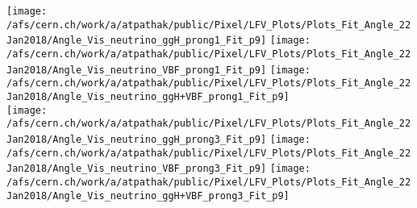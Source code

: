 \documentclass{beamer}
\begin{document}
\begin{frame}
\begin{normalsize}
\begin{center}
\texttt{[image: /afs/cern.ch/work/a/atpathak/public/Pixel/LFV\_Plots/Plots\_Fit\_Angle\_22Jan2018/Angle\_Vis\_neutrino\_ggH\_prong1\_Fit\_p9]}
\texttt{[image: /afs/cern.ch/work/a/atpathak/public/Pixel/LFV\_Plots/Plots\_Fit\_Angle\_22Jan2018/Angle\_Vis\_neutrino\_VBF\_prong1\_Fit\_p9]}
\texttt{[image: /afs/cern.ch/work/a/atpathak/public/Pixel/LFV\_Plots/Plots\_Fit\_Angle\_22Jan2018/Angle\_Vis\_neutrino\_ggH+VBF\_prong1\_Fit\_p9]}\\
\texttt{[image: /afs/cern.ch/work/a/atpathak/public/Pixel/LFV\_Plots/Plots\_Fit\_Angle\_22Jan2018/Angle\_Vis\_neutrino\_ggH\_prong3\_Fit\_p9]}
\texttt{[image: /afs/cern.ch/work/a/atpathak/public/Pixel/LFV\_Plots/Plots\_Fit\_Angle\_22Jan2018/Angle\_Vis\_neutrino\_VBF\_prong3\_Fit\_p9]}
\texttt{[image: /afs/cern.ch/work/a/atpathak/public/Pixel/LFV\_Plots/Plots\_Fit\_Angle\_22Jan2018/Angle\_Vis\_neutrino\_ggH+VBF\_prong3\_Fit\_p9]}\\
\end{center}
\end{normalsize}
\end {frame}
\end{document}
